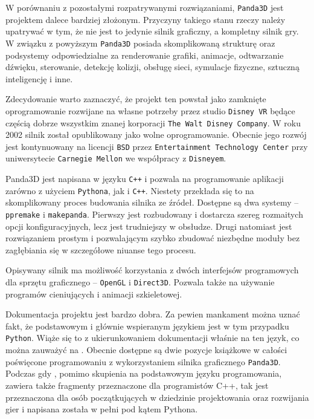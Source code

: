 \documentclass[11pt]{mwrep}
\begin{document}
      W porównaniu z pozostałymi rozpatrywanymi rozwiązaniami, \texttt{Panda3D} jest projektem dalece bardziej złożonym. Przyczyny takiego stanu rzeczy należy upatrywać w tym, że nie jest to jedynie silnik graficzny, a kompletny silnik gry. W związku z powyższym \texttt{Panda3D} posiada skomplikowaną strukturę oraz podsystemy odpowiedzialne za renderowanie grafiki, animacje, odtwarzanie dźwięku, sterowanie, detekcję kolizji, obsługę sieci, symulacje fizyczne, sztuczną inteligencję i inne.

      Zdecydowanie warto zaznaczyć, że projekt ten powstał jako zamknięte oprogramowanie rozwijane na własne potrzeby przez studio \texttt{Disney VR} będące częścią dobrze wszystkim znanej korporacji \texttt{The Walt Disney Company}. W roku 2002 silnik został opublikowany jako wolne oprogramowanie. Obecnie jego rozwój jest kontynuowany na licencji \texttt{BSD} przez \texttt{Entertainment Technology Center} przy uniwersytecie \texttt{Carnegie Mellon} we współpracy z \texttt{Disneyem}.

      Panda3D jest napisana w języku \texttt{C++} i pozwala na programowanie aplikacji zarówno z użyciem \texttt{Pythona}, jak i \texttt{C++}. Niestety przekłada się to na skomplikowany proces budowania silnika ze źródeł. Dostępne są dwa systemy -- \texttt{ppremake} i \texttt{makepanda}. Pierwszy jest rozbudowany i dostarcza szereg rozmaitych opcji konfiguracyjnych, lecz jest trudniejszy w obsłudze. Drugi natomiast jest rozwiązaniem prostym i pozwalającym szybko zbudować niezbędne moduły bez zagłębiania się w szczegółowe niuanse tego procesu.

      Opisywany silnik ma możliwość korzystania z dwóch interfejsów programowych dla sprzętu graficznego -- \texttt{OpenGL} i \texttt{Direct3D}. Pozwala także na używanie programów cieniujących i animacji szkieletowej.

     Dokumentacja projektu jest bardzo dobra. Za pewien mankament można uznać fakt, że podstawowym i głównie wspieranym językiem jest w tym przypadku \texttt{Python}. Wiąże się to z ukierunkowaniem dokumentacji właśnie na ten język, co można zauważyć na \cite{panda}. Obecnie dostępne są dwie pozycje książkowe w całości poświęcone programowaniu z wykorzystaniem silnika graficznego \texttt{Panda3D}. Podczas gdy \cite{pandab1}, pomimo skupienia na podstawowym języku programowania, zawiera także fragmenty przeznaczone dla programistów C++, tak \cite{pandab2} jest przeznaczona dla osób początkujących w dziedzinie projektowania oraz rozwijania gier i napisana została w pełni pod kątem Pythona.
\end{document}
